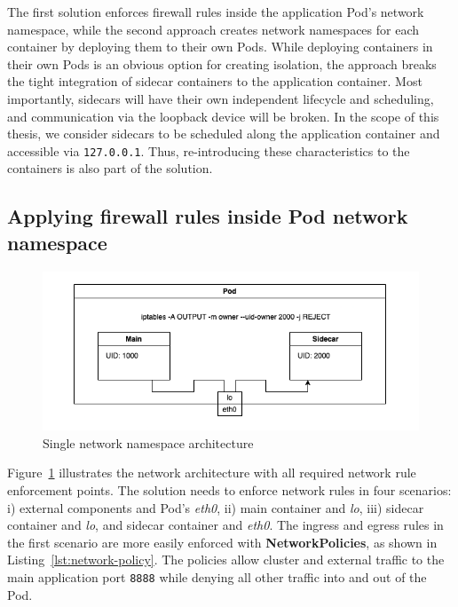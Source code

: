 \documentclass[english, 12pt, a4paper, sci, utf8, a-2b, online]{aaltothesis}
\begin{document}
The first solution enforces firewall rules inside the application Pod's network namespace, while the second approach creates network namespaces for each container by deploying them to their own Pods.
While deploying containers in their own Pods is an obvious option for creating isolation, the approach breaks the tight integration of sidecar containers to the application container.
Most importantly, sidecars will have their own independent lifecycle and scheduling, and communication via the loopback device will be broken.
In the scope of this thesis, we consider sidecars to be scheduled along the application container and accessible via \lstinline{127.0.0.1}.
Thus, re-introducing these characteristics to the containers is also part of the solution.

\subsection{Applying firewall rules inside Pod network namespace}

\begin{figure}[h!]
  \centering
  \includegraphics[width=\linewidth]{files/iptables.png}
  \caption{Single network namespace architecture}
  \label{fig:single-net-solution}
\end{figure}

Figure~\ref{fig:single-net-solution} illustrates the network architecture with all required network rule enforcement points.
The solution needs to enforce network rules in four scenarios: i) external components and Pod's \emph{eth0}, ii) main container and \emph{lo}, iii) sidecar container and \emph{lo}, and sidecar container and \emph{eth0}.
The ingress and egress rules in the first scenario are more easily enforced with \textbf{NetworkPolicies}, as shown in Listing~\ref{lst:network-policy}.
The policies allow cluster and external traffic to the main application port \lstinline{8888} while denying all other traffic into and out of the Pod.
\end{document}
